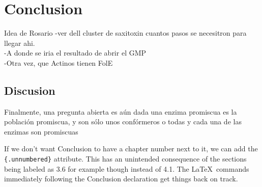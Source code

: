 \documentclass[12pt,twoside]{reedthesis}
\begin{document}
\begin{Shaded}
\begin{Highlighting}[]
  \NormalTok{(}  \StringTok{ }\NormalTok{() +}\StringTok{ }\NormalTok{(}\NormalTok{) +}\StringTok{ }\NormalTok{(}\NormalTok{) +}\StringTok{ }\NormalTok{(}\NormalTok{) +}\StringTok{  }\NormalTok{(} \NormalTok{) +}\StringTok{ }\NormalTok{(} \NormalTok{(}   \NormalTok{)}
  
  \NormalTok{(}\NormalTok{, } \NormalTok{, } \NormalTok{)}
  \end{Highlighting}
  \end{Shaded}
  
  \chapter*{Conclusion}\label{conclusion}
  
  \setcounter{chapter}{4} \setcounter{section}{0}
  
  Idea de Rosario -ver dell cluster de saxitoxin cuantos pasos se
  necesitron para llegar ahi.\\
  -A donde se iria el resultado de abrir el GMP\\
  -Otra vez, que Actinos tienen FolE
  
  \section{Discusion}\label{discusion-1}
  
  Finalmente, una pregunta abierta es aún dada una enzima promiscua es la
  población promiscua, y son sólo unos confórmeros o todas y cada una de
  las enzimas son promiscuas
  
  If we don't want Conclusion to have a chapter number next to it, we can
  add the \texttt{\{.unnumbered\}} attribute. This has an unintended
  consequence of the sections being labeled as 3.6 for example though
  instead of 4.1. The \LaTeX~commands immediately following the Conclusion
  declaration get things back on track.
  
\end{document}
